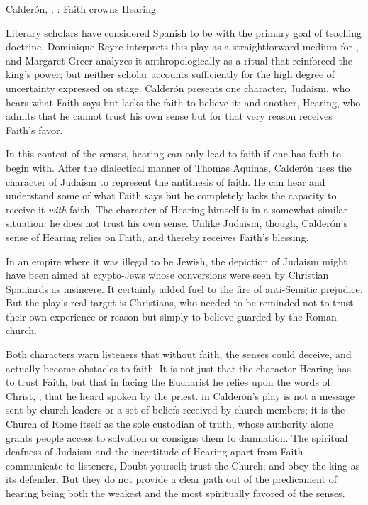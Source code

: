 
{Calderón, , : Faith crowns
Hearing}

Literary scholars have considered Spanish  to be
 with the primary goal of teaching
doctrine.%
    \Autocite{Wardropper:TeatroReligioso}
Dominique Reyre interprets this play as a straightforward medium for
, and Margaret Greer analyzes it
anthropologically as a ritual that reinforced the king's power; but neither
scholar accounts sufficiently for the high degree of uncertainty expressed on
stage.%
    \Autocites
    {Reyre:Retiro}
    {Greer:Retiro}
Calderón presents one character, Judaism, who hears what Faith says but lacks
the faith to believe it; and another, Hearing, who admits that he cannot trust
his own sense but for that very reason receives Faith's favor.

In this contest of the senses, hearing can only lead to faith if one has
faith to begin with.
After the dialectical manner of Thomas Aquinas, Calderón uses the character of
Judaism to represent the antithesis of faith.
He can hear and understand some of what Faith says but he completely lacks the
capacity to receive it \emph{with} faith.
The character of Hearing himself is in a somewhat similar situation: he does
not trust his own sense.
Unlike Judaism, though, Calderón's sense of Hearing relies on Faith, and
thereby receives Faith's blessing.


In an empire where it was illegal to be Jewish, the depiction of Judaism might
have been aimed at crypto-Jews whose conversions were seen by Christian
Spaniards as insincere. 
It certainly added fuel to the fire of anti-Semitic prejudice.
But the play's real target is Christians, who needed to be reminded not to
trust their own experience or reason but simply to believe 
guarded by the Roman church.

Both characters warn listeners that without faith, the senses could deceive,
and actually become obstacles to faith.
It is not just that the character Hearing has to trust Faith, but that in
facing the Eucharist he relies upon the words of Christ, , that he heard spoken by the priest.
 in Calderón's play is not a message sent by church leaders
or a set of beliefs received by church members; it is the Church of Rome
itself as the sole custodian of truth, whose authority alone grants people
access to salvation or consigns them to damnation.
The spiritual deafness of Judaism and the incertitude of Hearing apart from
Faith communicate to listeners, Doubt yourself; trust the Church; and obey the
king as its defender.
But they do not provide a clear path out of the predicament of hearing being
both the weakest and the most spiritually favored of the senses.

